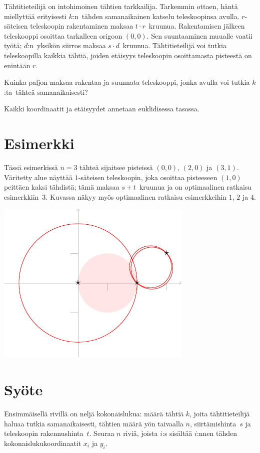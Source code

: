 
\noindent
Tähtitieteilijä on intohimoinen tähtien tarkkailija.
Tarkemmin ottaen, häntä miellyttää erityisesti $k$:n~tähden samanaikainen katselu teleskoopinsa avulla.
$r$-säteisen teleskoopin rakentaminen maksaa $t\cdot r$~kruunua.
Rakentamisen jälkeen teleskooppi osoittaa tarkalleen origoon $(0,0)$.
Sen suuntaaminen muualle vaatii työtä;
$d$:n~yksikön siirros maksaa $s\cdot d$~kruunua.
Tähtitieteilijä voi tutkia teleskoopilla kaikkia tähtiä, joiden etäisyys teleskoopin osoittamasta pisteestä on enintään $r$.

Kuinka paljon maksaa rakentaa ja suunnata teleskooppi, jonka avulla voi tutkia $k$:ta~tähteä samanaikaisesti?

\medskip

Kaikki koordinaatit ja etäisyydet annetaan euklidisessa tasossa.


\section*{Esimerkki}

Tässä esimerkissä $n=3$ tähteä sijaitsee pisteissä $(0,0)$, $(2,0)$ ja $(3,1)$.
Väritetty alue näyttää $1$-säteisen teleskoopin, joka osoittaa pisteeseen $(1,0)$ peittäen kaksi tähdistä; tämä maksaa $s + t$~kruunua ja on optimaalinen ratkaisu esimerkkiin~$3$.
Kuvassa näkyy myös optimaalinen ratkaisu esimerkkeihin $1$, $2$ ja $4$.

\medskip
\noindent
\includegraphics[width=.3\textwidth]{img/samples.pdf}


\section*{Syöte}

Ensimmäisellä rivillä on neljä kokonaislukua:
määrä tähtiä $k$, joita tähtitieteilijä haluaa tutkia samanaikaisesti,
tähtien määrä yön taivaalla $n$,
siirtämishinta~$s$
ja
teleskoopin rakennushinta~$t$.
Seuraa $n$ riviä,
joista $i$:s sisältää $i$:nnen tähden kokonaislukukoordinaatit $x_i$ ja $y_i$.


